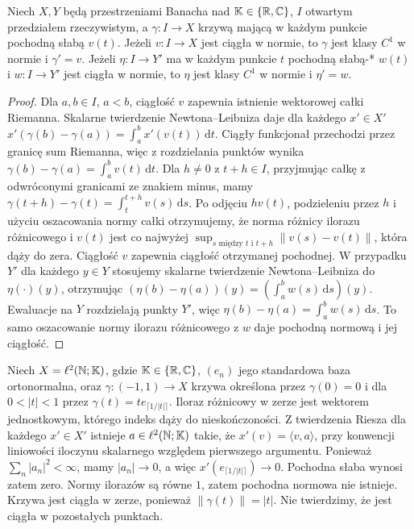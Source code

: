 \begin{stwierdzenie}
\label{prop:weak-to-strong-derivative14}
Niech $X,Y$ będą przestrzeniami Banacha nad $\mathbb K\in\{\mathbb R,\mathbb C\}$,
$I$ otwartym przedziałem rzeczywistym, a $\gamma:I\to X$ krzywą
mającą w każdym punkcie pochodną słabą $v(t)$.
Jeżeli $v:I\to X$ jest ciągła w normie, to $\gamma$
jest klasy $C^1$ w normie i $\gamma'=v$.
Jeżeli $\eta:I\to Y'$ ma w każdym punkcie $t$ pochodną
słabą-* $w(t)$ i $w:I\to Y'$ jest ciągła w normie,
to $\eta$ jest klasy $C^1$ w normie i $\eta'=w$.
\end{stwierdzenie}
\begin{proof}
Dla $a,b\in I$, $a<b$, ciągłość $v$ zapewnia istnienie
wektorowej całki Riemanna. Skalarne twierdzenie
Newtona--Leibniza daje dla każdego $x'\in X'$
$x'(\gamma(b)-\gamma(a))=\int_a^b x'(v(t))\,\mathrm dt$.
Ciągły funkcjonał przechodzi przez granicę sum Riemanna,
więc z rozdzielania punktów wynika
$\gamma(b)-\gamma(a)=\int_a^b v(t)\,\mathrm dt$.
Dla $h\ne0$ z $t+h\in I$, przyjmując całkę z odwróconymi
granicami ze znakiem minus, mamy
$\gamma(t+h)-\gamma(t)=\int_t^{t+h}v(s)\,\mathrm ds$.
Po odjęciu $hv(t)$, podzieleniu przez $h$ i użyciu
oszacowania normy całki otrzymujemy, że norma różnicy
ilorazu różnicowego i $v(t)$ jest co najwyżej
$\sup_{s\text{ między }t\text{ i }t+h}\|v(s)-v(t)\|$,
która dąży do zera. Ciągłość $v$ zapewnia ciągłość otrzymanej pochodnej.
W przypadku $Y'$ dla każdego $y\in Y$ stosujemy
skalarne twierdzenie Newtona--Leibniza do $\eta(\cdot)(y)$,
otrzymując $(\eta(b)-\eta(a))(y)=(\int_a^b w(s)\,\mathrm ds)(y)$.
Ewaluacje na $Y$ rozdzielają punkty $Y'$, więc
$\eta(b)-\eta(a)=\int_a^b w(s)\,\mathrm ds$.
To samo oszacowanie normy ilorazu różnicowego z $w$
daje pochodną normową i jej ciągłość.
\end{proof}

\begin{przyklad}
\label{ex:weak-not-norm-derivative14}
Niech $X=\ell^2(\mathbb N;\mathbb K)$, gdzie $\mathbb K\in\{\mathbb R,\mathbb C\}$,
$(e_n)$ jego standardowa baza ortonormalna,
oraz $\gamma:(-1,1)\to X$ krzywa określona przez $\gamma(0)=0$ i dla $0<|t|<1$ przez
$\gamma(t)=t e_{\lceil1/|t|\rceil}$. Iloraz różnicowy
w zerze jest wektorem jednostkowym, którego indeks
dąży do nieskończoności. Z twierdzenia Riesza dla każdego $x'\in X'$ istnieje
$a\in\ell^2(\mathbb N;\mathbb K)$ takie, że $x'(v)=\langle v,a\rangle$,
przy konwencji liniowości iloczynu skalarnego względem
pierwszego argumentu. Ponieważ $\sum_n|a_n|^2<\infty$,
mamy $|a_n|\to0$, a więc $x'(e_{\lceil1/|t|\rceil})\to0$.
Pochodna słaba wynosi zatem zero. Normy ilorazów są równe $1$, zatem pochodna
normowa nie istnieje. Krzywa jest ciągła w zerze,
ponieważ $\|\gamma(t)\|=|t|$. Nie twierdzimy, że jest
ciągła w pozostałych punktach.
\end{przyklad}

